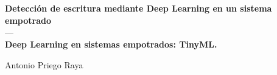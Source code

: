 \chapter*{}






\cleardoublepage
\thispagestyle{empty}

\begin{center}
{\large\bfseries Detección de escritura mediante Deep Learning en
un sistema empotrado\\
}
\textsc{---}\\
{\small\bfseries Deep Learning en sistemas empotrados: TinyML.}\\
\end{center}
\begin{center}
Antonio Priego Raya\\
\end{center}

\\

\vspace{0.7cm}
\\

\begin{comment}
Creación de un dispositivo autónomo con forma de lápiz en el que integrar un
sistema empotrado, concretamente haré uso de la Arduino Nano Sense 33 BLE.
El propósito de este dispositivo será la detección de letras en tiempo
real, registrando el movimiento del dispositivo para resolver la detección
de estas.\\
Para el procesamiento y clasificación de los movimientos se empleará
deep learning, con un modelo de red neuronal convolucional. Con la
particularidad de ejecutar el procesamiento del modelo en el propio
dispositivo, para dotarlo de autonomía.\\
Por tanto se desarrollarán todos los pasos propios del trabajo con
redes neuronales: diseño del modelo, recolección de datos, entrenamiento
del modelo, etc.\\
Complementario al dispositivo, también se creará un interfaz donde acceder
a las funciones del dispositivo.
\end{comment}
\cleardoublepage


